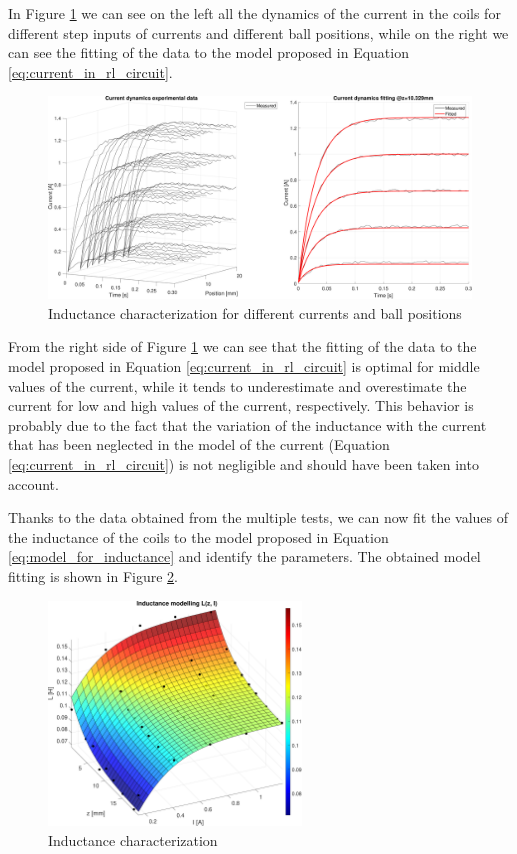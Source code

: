 In Figure \ref{fig:inductance_characterization_currents} we can see on the left all the dynamics of the current in the coils for different step inputs of currents and different ball positions, while on the right we can see the fitting of the data to the model proposed in Equation \ref{eq:current_in_rl_circuit}.

\begin{figure}[H]
    \centering
    \includegraphics[width=1\textwidth]{img/MATLAB/identification/currents.pdf}
    \caption{Inductance characterization for different currents and ball positions}
    \label{fig:inductance_characterization_currents}
\end{figure}

From the right side of Figure \ref{fig:inductance_characterization_currents} we can see that the fitting of the data to the model proposed in Equation \ref{eq:current_in_rl_circuit} is optimal for middle values of the current, while it tends to underestimate and overestimate the current for low and high values of the current, respectively.
This behavior is probably due to the fact that the variation of the inductance with the current that has been neglected in the model of the current (Equation \ref{eq:current_in_rl_circuit}) is not negligible and should have been taken into account.

Thanks to the data obtained from the multiple tests, we can now fit the values of the inductance of the coils to the model proposed in Equation \ref{eq:model_for_inductance} and identify the parameters.
The obtained model fitting is shown in Figure \ref{fig:inductance_characterization_inductance}.

\begin{figure}[H]
    \centering
    \includegraphics[width=0.6\textwidth]{img/MATLAB/identification/inductance.pdf}
    \caption{Inductance characterization}
    \label{fig:inductance_characterization_inductance}
\end{figure}

